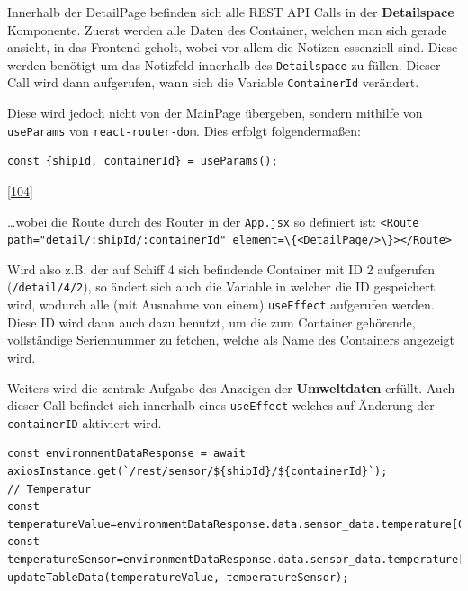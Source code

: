 \documentclass[
    headings=optiontotocandhead,%
    twoside,
    numbers=noenddot,%
    12pt, %
    titlepage, %
    parskip=full, %
    listof=leveldown, 
    numbers=noenddot, %
    a4paper,DIV=14,
    BCOR=15mm,
]{scrbook}
\newcommand{\passthrough}[1]{#1}
\begin{document}
Innerhalb der DetailPage befinden sich alle REST API Calls in der
\textbf{Detailspace} Komponente. Zuerst werden alle Daten des Container,
welchen man sich gerade ansieht, in das Frontend geholt, wobei vor allem
die Notizen essenziell sind. Diese werden benötigt um das Notizfeld
innerhalb des \passthrough{\lstinline!Detailspace!} zu füllen. Dieser
Call wird dann aufgerufen, wann sich die Variable
\passthrough{\lstinline!ContainerId!} verändert.

Diese wird jedoch nicht von der MainPage übergeben, sondern mithilfe von
\passthrough{\lstinline!useParams!} von
\passthrough{\lstinline!react-router-dom!}. Dies erfolgt folgendermaßen:

\begin{lstlisting}[caption={Verwendung von useParams()}]
const {shipId, containerId} = useParams();
\end{lstlisting}

{[}\protect\hyperlink{ref-Refine-ReactRouter}{104}{]}

\ldots wobei die Route durch des Router in der
\passthrough{\lstinline!App.jsx!} so definiert ist:
\passthrough{\lstinline!<Route path="detail/:shipId/:containerId" element=\{<DetailPage/>\}></Route>!}

Wird also z.B. der auf Schiff 4 sich befindende Container mit ID 2
aufgerufen (\passthrough{\lstinline!/detail/4/2!}), so ändert sich auch
die Variable in welcher die ID gespeichert wird, wodurch alle (mit
Ausnahme von einem) \passthrough{\lstinline!useEffect!} aufgerufen
werden. Diese ID wird dann auch dazu benutzt, um die zum Container
gehörende, vollständige Seriennummer zu fetchen, welche als Name des
Containers angezeigt wird.

Weiters wird die zentrale Aufgabe des Anzeigen der \textbf{Umweltdaten}
erfüllt. Auch dieser Call befindet sich innerhalb eines
\passthrough{\lstinline!useEffect!} welches auf Änderung der
\passthrough{\lstinline!containerID!} aktiviert wird.

\begin{lstlisting}[caption={Fetchen und speichern einer der sieben Umweltdaten}]
const environmentDataResponse = await axiosInstance.get(`/rest/sensor/${shipId}/${containerId}`);
// Temperatur
const temperatureValue=environmentDataResponse.data.sensor_data.temperature[0].value;
const temperatureSensor=environmentDataResponse.data.sensor_data.temperature[0].sensor;
updateTableData(temperatureValue, temperatureSensor);
\end{lstlisting}
\end{document}
